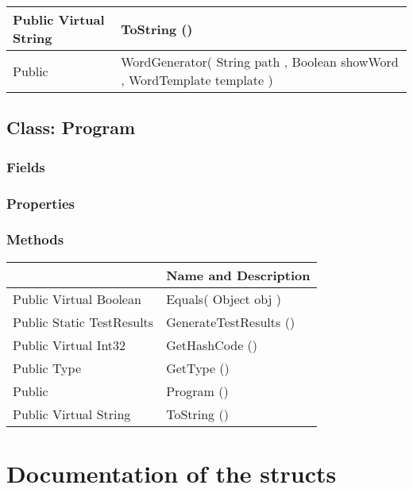 \documentclass[11pt, oneside, a4paper]{book}
\begin{document}
\begin{center}
\begin{tabular}{| p{3cm} | p{12cm} | }
\hline
 Public  Virtual  String &  ToString ()\hypertarget{SoftwareEngineeringTools.{}Documentation.{}WordGenerator.{}ToString}{}\\
\hline
 Public  &  WordGenerator(\hypertarget{SoftwareEngineeringTools.{}Documentation.{}WordGenerator.{}WordGenerator\_String\_Boolean\_WordTemplate}{} String  path  ,  Boolean  showWord  ,  WordTemplate  template  )\\
\hline
\end{tabular}
\end{center}
 


\hypertarget{SoftwareEngineeringTools.{}Program}{}
\section{Class: Program}

\subsection{Fields}

\subsection{Properties}

\subsection{Methods}
\begin{center}
\begin{tabular}{| p{3cm} | p{12cm} | }
\hline
\textbf{ } & \textbf{ Name and Description}\\
\hline
 Public  Virtual  Boolean &  Equals(\hypertarget{SoftwareEngineeringTools.{}Program.{}Equals\_Object}{} Object  obj  )\\
\hline
 Public  Static  TestResults &  GenerateTestResults ()\hypertarget{SoftwareEngineeringTools.{}Program.{}GenerateTestResults}{}\\
\hline
 Public  Virtual  Int32 &  GetHashCode ()\hypertarget{SoftwareEngineeringTools.{}Program.{}GetHashCode}{}\\
\hline
 Public  Type &  GetType ()\hypertarget{SoftwareEngineeringTools.{}Program.{}GetType}{}\\
\hline
 Public  &  Program ()\hypertarget{SoftwareEngineeringTools.{}Program.{}Program}{}\\
\hline
 Public  Virtual  String &  ToString ()\hypertarget{SoftwareEngineeringTools.{}Program.{}ToString}{}\\
\hline
\end{tabular}
\end{center}
 


\chapter{Documentation of the structs}
\end{document}
